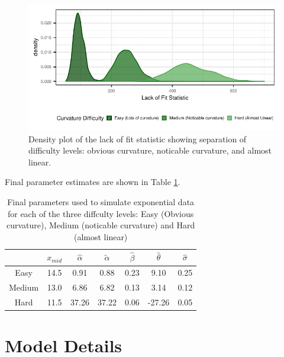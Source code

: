 \begin{appendix}
\begin{figure}

{\centering \includegraphics[width=\columnwidth]{./images/lof-density-curves-1} 

}

\caption{Density plot of the lack of fit statistic showing separation of difficulty levels: obvious curvature, noticable curvature, and almost linear.}\label{fig:lof-density-curves}
\end{figure}

Final parameter estimates are shown in Table \ref{tab:parameter-data}.

\begin{table}

\caption{\label{tab:parameter-data}Final parameters used to simulate exponential data for each of the three diffculty levels: Easy (Obvious curvature), Medium (noticable curvature) and Hard (almost linear)}
\centering
\begin{tabular}[t]{ccccccc}
\toprule
 & $x_{mid}$ & $\hat\alpha$ & $\tilde\alpha$ & $\hat\beta$ & $\hat\theta$ & $\hat\sigma$\\
\midrule
Easy & 14.5 & 0.91 & 0.88 & 0.23 & 9.10 & 0.25\\
Medium & 13.0 & 6.86 & 6.82 & 0.13 & 3.14 & 0.12\\
Hard & 11.5 & 37.26 & 37.22 & 0.06 & -27.26 & 0.05\\
\bottomrule
\end{tabular}
\end{table}

\hypertarget{model-details}{%
\section{\texorpdfstring{Model Details
\label{app:glmm-model}}{Model Details }}\label{model-details}}


\end{appendix}
